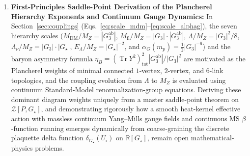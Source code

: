 \documentclass[11pt,a4paper]{article}
\theoremstyle{definition}
\theoremstyle{remark}
\newcommand{\R}{\mathbb{R}}
\newcommand{\Tr}{\operatorname{Tr}}
\newcommand{\Gthree}{G_3}
\newcommand{\Gstar}{G_\star}
\begin{document}
\begin{enumerate}
    \item \textbf{First-Principles Saddle-Point Derivation of the Plancherel Hierarchy Exponents and Continuum Gauge Dynamics:}
    In Section~\ref{sec:couplings} (Eqs.~\eqref{eq:scale_mdm}--\eqref{eq:scale_alphag}), the seven hierarchy scales ($M_{\mathrm{DM}}/M_Z = |\Gthree^{\mathrm{ab}}|$, $M_{\mathrm{fl}}/M_Z = |\Gthree|\cdot|\Gthree^{\mathrm{ab}}|$, $\Lambda/M_Z = |\Gthree|^2/8$, $\Lambda_\nu/M_Z = |\Gthree|\cdot|\Gstar|$, $E_\Lambda/M_Z = |\Gstar|^{-2}$, and $\alpha_G(m_p) = \frac{1}{2}|\Gthree|^{-6}$) and the baryon asymmetry formula $\eta_B = (\Tr Y^2)_{\mathrm{tot}}^2 |\Gthree^{\mathrm{ab}}|/|\Gthree|^2$ are motivated as the Plancherel weights of minimal connected $1$-vertex, $2$-vertex, and $6$-link topologies, and the coupling evolution from $\Lambda$ to $M_Z$ is evaluated using continuum Standard-Model renormalization-group equations. Deriving these dominant diagram weights uniquely from a master saddle-point theorem on $\mathcal{Z}[P, \Gstar]$, and demonstrating rigorously how a smooth heat-kernel effective action with massless continuum Yang--Mills gauge fields and continuous $\overline{\mathrm{MS}}$ $\beta$-function running emerges dynamically from coarse-graining the discrete plaquette delta function $\delta_{\Gstar}(U_\square)$ on $\R[\Gstar]$, remain open mathematical-physics problems.


\end{enumerate}
\end{document}
